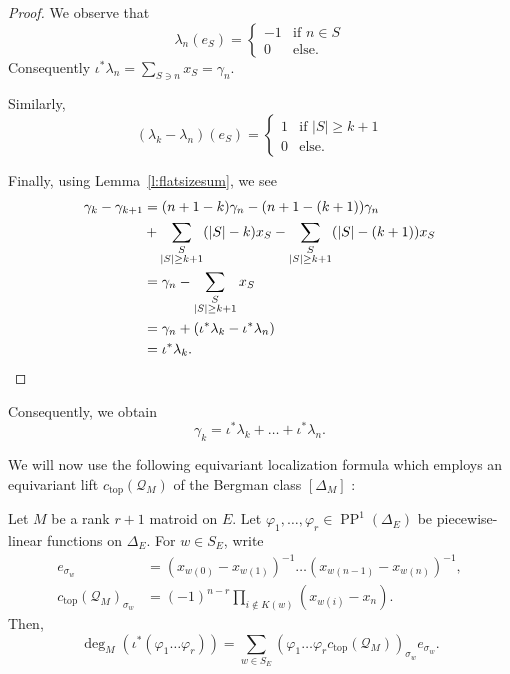 \documentclass[ALCO,published]{cedram}
\numberwithin{equation}{section}
\numberwithin{figure}{section}
\DeclareMathOperator{\topp}{top}
\begin{document}
\begin{proof}
    We observe that 
    \[\lambda_n(e_S)=
    \begin{cases}
      -1&\text{if $n\in S$}\\
      0 &\text{else}.
    \end{cases}\]
    Consequently $\iota^*\lambda_n=\sum_{S\ni n} x_S=\gamma_n$.

    Similarly,
    \[(\lambda_k-\lambda_n)(e_S)=
    \begin{cases}
      1&\text{if $|S|\geq k+1$}\\
      0 &\text{else}.
    \end{cases}\]

    Finally, using Lemma~\ref{l:flatsizesum}, we see
    \begin{align*}
      \gamma_k-\gamma_{k+1}&=(n+1-k)\gamma_n-(n+1-(k+1))\gamma_n\\
      &+
      \sum_{\substack{S\\|S|\geq k+1}} (|S|-k)x_S
      - \sum_{\substack{S\\|S|\geq k+1}} (|S|-(k+1))x_S\\
      &=\gamma_n-\sum_{\substack{S\\|S|\geq k+1}} x_S\\
      &=\gamma_n+(\iota^*\lambda_{k}-\iota^*\lambda_n)\\
      &= \iota^*\lambda_k.\qedhere
    \end{align*} 
\end{proof}
Consequently, we obtain 
\[\gamma_k=\iota^*\lambda_k+\dots+\iota^*\lambda_n.\]

We will now use the following equivariant localization formula which employs an equivariant lift $c_{\topp}(\mathcal{Q}_M)$ of the Bergman class $[\Delta_M]$ :

\begin{theorem} \label{t:localizationformula}
    Let $M$ be a rank $r+1$ matroid on $E$. Let $\varphi_1,\dots,\varphi_r\in\operatorname{PP}^1(\Delta_{E})$ be piecewise-linear functions on $\Delta_{E}$. For $w\in S_{E}$, write 
    \begin{align*}
    e_{\sigma_w}&=(x_{w(0)}-x_{w(1)})^{-1}\dots (x_{w(n-1)}-x_{w(n)})^{-1},\\
    c_{\topp}(\mathcal{Q}_M)_{\sigma_w}&=(-1)^{n-r}\prod_{i\not\in K(w)}(x_{w(i)}-x_n).
    \end{align*}
    Then,
    \begin{equation} \label{eq:degreeformula}
        \deg_M(\iota^*(\varphi_1\dots\varphi_r))=\sum_{w\in S_{E}} (\varphi_1\dots\varphi_rc_{\topp}(\mathcal{Q}_M))_{\sigma_w}e_{\sigma_w}.
    \end{equation}
\end{theorem}
\end{document}

